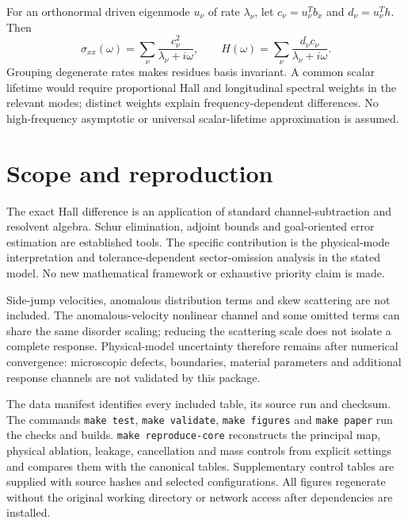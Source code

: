 \documentclass[11pt]{article}
\begin{document}
For an orthonormal driven eigenmode $u_\nu$ of rate $\lambda_\nu$, let $c_\nu=u_\nu^Tb_x$ and $d_\nu=u_\nu^Th$. Then
\begin{equation}
\sigma_{xx}(\omega)=\sum_\nu\frac{c_\nu^2}{\lambda_\nu+i\omega},\qquad
H(\omega)=\sum_\nu\frac{d_\nu c_\nu}{\lambda_\nu+i\omega}.
\end{equation}
Grouping degenerate rates makes residues basis invariant. A common scalar lifetime would require proportional Hall and longitudinal spectral weights in the relevant modes; distinct weights explain frequency-dependent differences. No high-frequency asymptotic or universal scalar-lifetime approximation is assumed.

\section{Scope and reproduction}
The exact Hall difference is an application of standard channel-subtraction and resolvent algebra. Schur elimination, adjoint bounds and goal-oriented error estimation are established tools. The specific contribution is the physical-mode interpretation and tolerance-dependent sector-omission analysis in the stated model. No new mathematical framework or exhaustive priority claim is made.

Side-jump velocities, anomalous distribution terms and skew scattering are not included. The anomalous-velocity nonlinear channel and some omitted terms can share the same disorder scaling; reducing the scattering scale does not isolate a complete response. Physical-model uncertainty therefore remains after numerical convergence: microscopic defects, boundaries, material parameters and additional response channels are not validated by this package.

The data manifest identifies every included table, its source run and checksum. The commands \texttt{make test}, \texttt{make validate}, \texttt{make figures} and \texttt{make paper} run the checks and builds. \texttt{make reproduce-core} reconstructs the principal map, physical ablation, leakage, cancellation and mass controls from explicit settings and compares them with the canonical tables. Supplementary control tables are supplied with source hashes and selected configurations. All figures regenerate without the original working directory or network access after dependencies are installed.
\end{document}
